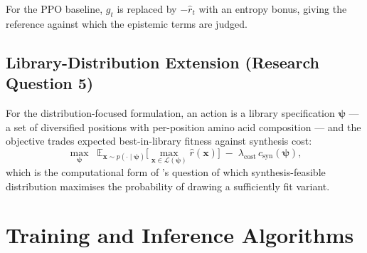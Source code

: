 \documentclass[12pt, a4paper]{article}
\begin{document}
\noindent For the PPO baseline, $g_t$ is replaced by $-\hat{r}_t$ with an entropy bonus, giving the reference against which the epistemic terms are judged.

\subsection{Library-Distribution Extension (Research Question 5)}

For the distribution-focused formulation, an action is a library specification $\boldsymbol{\psi}$ --- a set of diversified positions with per-position amino acid composition --- and the objective trades expected best-in-library fitness against synthesis cost:
\begin{equation}
    \max_{\boldsymbol{\psi}} \;\; \mathbb{E}_{\mathbf{x} \sim p(\cdot \mid \boldsymbol{\psi})}\Big[\max_{\mathbf{x} \in \mathcal{L}(\boldsymbol{\psi})} \hat{r}(\mathbf{x})\Big] \;-\; \lambda_\text{cost}\, c_\text{syn}(\boldsymbol{\psi}),
\end{equation}
which is the computational form of \citet{wittmann2026retrospective}'s question of which synthesis-feasible distribution maximises the probability of drawing a sufficiently fit variant.


\section{Training and Inference Algorithms}
\label{app:algorithms}
\end{document}
